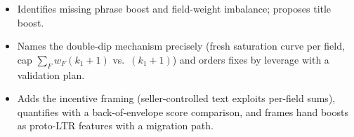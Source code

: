 \begin{interviewq}

\goodgreat
\begin{itemize}
    \item {} Identifies missing phrase boost and field-weight imbalance; proposes title boost.
    \item {} Names the double-dip mechanism precisely (fresh saturation curve per field, cap $\sum_F w_F(k_1+1)$ vs.\ $(k_1+1)$) and orders fixes by leverage with a validation plan.
    \item {} Adds the incentive framing (seller-controlled text exploits per-field sums), quantifies with a back-of-envelope score comparison, and frames hand boosts as proto-LTR features with a migration path.
\end{itemize}

\end{interviewq}

